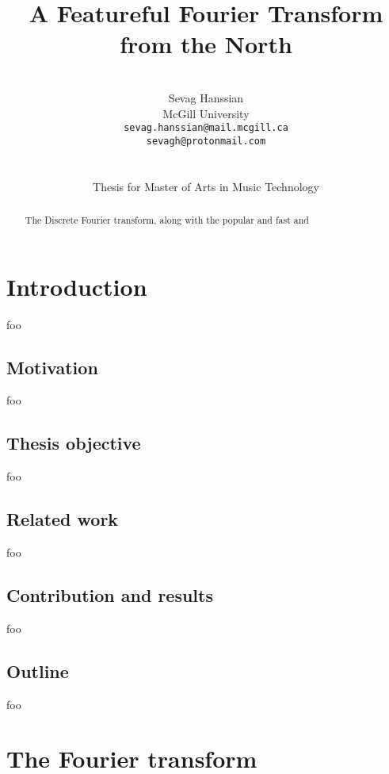 \documentclass[letter,12pt]{article}
\title{A Featureful Fourier Transform from the North}
\author{\vspace{2em}\\Sevag Hanssian \\
  McGill University \\
 \texttt{sevag.hanssian@mail.mcgill.ca} \\
 \texttt{sevagh@protonmail.com} \\\ \\\ \\
 Thesis for Master of Arts in Music Technology}
\date{}
\begin{document}
\maketitle

\vfill
\clearpage %

\tableofcontents

\vfill
\clearpage %

\listoffigures

\listoflistings

\vfill
\clearpage %

\begin{abstract}
	The Discrete Fourier transform, along with the popular and fast and 
\end{abstract}

\section{Introduction}
\label{sec:intro}

foo

\subsection{Motivation}

foo

\subsection{Thesis objective}

foo

\subsection{Related work}

foo

\subsection{Contribution and results}

foo

\subsection{Outline}

foo

\section{The Fourier transform}
\end{document}
